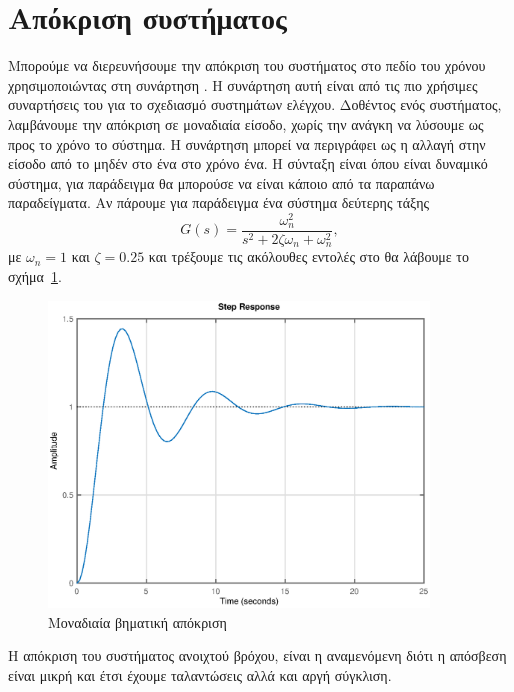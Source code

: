 \section{Απόκριση συστήματος}
Μπορούμε να διερευνήσουμε την απόκριση του συστήματος στο πεδίο του χρόνου
χρησιμοποιώντας στη συνάρτηση . Η συνάρτηση αυτή είναι από τις πιο
χρήσιμες συναρτήσεις του  για το σχεδιασμό συστημάτων ελέγχου.
Δοθέντος ενός συστήματος, λαμβάνουμε την απόκριση σε μοναδιαία είσοδο, χωρίς την
ανάγκη να λύσουμε ως προς το χρόνο το σύστημα. Η συνάρτηση  μπορεί να
περιγράφει ως η αλλαγή στην είσοδο από το μηδέν στο ένα στο χρόνο ένα. Η σύνταξη
είναι
όπου  είναι δυναμικό σύστημα, για παράδειγμα θα μπορούσε να είναι
κάποιο από τα παραπάνω παραδείγματα. Αν πάρουμε για παράδειγμα ένα σύστημα
δεύτερης τάξης
\[
    G(s) = \frac{\omega_n^2}{s^2 + 2\zeta\omega_n + \omega_n^2},
\]
με \( \omega_n = 1 \) και \( \zeta = 0.25 \) και τρέξουμε τις ακόλουθες εντολές
στο  θα λάβουμε το σχήμα~\ref{fig:prelim5}.
\eng{}
\begin{figure}[h!]
    \centering
    \includegraphics[width=0.9\textwidth]{figures/prelim5.eps}
    \caption{Μοναδιαία βηματική απόκριση}
    \label{fig:prelim5}
\end{figure}
Η απόκριση του συστήματος ανοιχτού βρόχου, είναι η αναμενόμενη διότι η απόσβεση
είναι μικρή και έτσι έχουμε ταλαντώσεις αλλά και αργή σύγκλιση.

